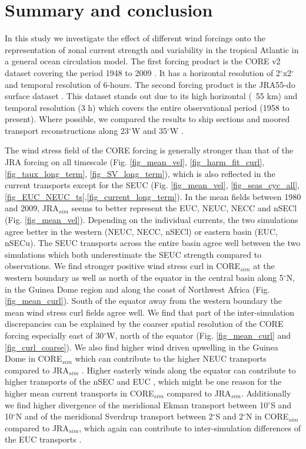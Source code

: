 \documentclass[os, manuscript]{copernicus}
\begin{document}
\section{Summary and conclusion}
In this study we investigate the effect of different wind forcings onto the representation of zonal current strength and variability in the tropical Atlantic in a general ocean circulation model. The first forcing product is the CORE v2 dataset covering the period 1948 to 2009 \citep{Griffies2009}. It has a horizontal resolution of 2$^{\circ}$x2$^{\circ}$ and temporal resolution of 6-hours. The second forcing product is the JRA55-do surface dataset \citep{Tsujino2018}. This dataset stands out due to its high horizontal (~55 km) and temporal resolution (3 h) which covers the entire observational period (1958 to present). Where possible, we compared the results to ship sections and moored transport reconstructions along 23$^{\circ}$W and 35$^{\circ}$W \citep{Brandt2021a,Burmeister2020,Tuchen2022}.

The wind stress field of the CORE forcing is generally stronger than that of the JRA forcing on all timescale (Fig. \ref{fig_mean_vel}, \ref{fig_harm_fit_curl}, \ref{fig_taux_long_term}, \ref{fig_SV_long_term}), which is also reflected in the current transports except for the SEUC (Fig. \ref{fig_mean_vel}, \ref{fig_seas_cyc_all},\ref{fig_EUC_NEUC_ts},\ref{fig_current_long_term}). In the mean fields between 1980 and 2009, JRA$_{sim}$ seems to better represent the EUC, NEUC, NECC and nSECl (Fig. \ref{fig_mean_vel}). Depending on the individual currents, the two simulations agree better in the western (NEUC, NECC, nSECl) or eastern basin (EUC, nSECu). The SEUC transports across the entire basin agree well between the two simulations which both underestimate the SEUC strength compared to observations. We find stronger positive wind stress curl in CORE$_{sim}$ at the western boundary as well as north of the equator in the central basin along 5$^{\circ}$N, in the Guinea Dome region and along the coast of Northwest Africa (Fig. \ref{fig_mean_curl}). South of the equator away from the western boundary the mean wind stress curl fields agree well. We find that part of the inter-simulation discrepancies can be explained by the coarser spatial resolution of the CORE forcing especially east of 30$^{\circ}$W, north of the equator (Fig. \ref{fig_mean_curl} and \ref{fig_curl_coarse}). We also find higher wind driven upwelling in the Guinea Dome in CORE$_{sim}$ which can contribute to the higher NEUC transports compared to JRA$_{sim}$ \citep{Stramma2005,Huettl2008,Goes2013}. Higher easterly winds along the equator can contribute to higher transports of the nSEC and EUC \citep{Wacongne1989}, which might be one reason for the higher mean current transports in CORE$_{sim}$ compared to JRA$_{sim}$. Additionally we find higher divergence of the meridional Ekman transport between 10$^{\circ}$S and 10$^{\circ}$N and of the meridional Sverdrup transport between 2$^{\circ}$S and 2$^{\circ}$N in CORE$_{sim}$ compared to JRA$_{sim}$, which again can contribute to inter-simulation differences of the EUC transports \citep{Brandt2021a,Arhan2006}. 
\end{document}
